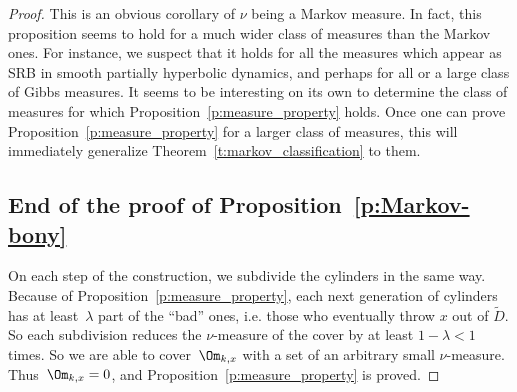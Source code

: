 \documentclass[a4paper,12pt]{amsart}
\begin{document}
\begin{proof}
This is an obvious corollary of $\nu$ being a Markov measure.
In fact, this proposition seems to hold for a much wider class of measures than the Markov ones. For instance, we suspect that it holds for all the measures which appear as SRB in smooth partially hyperbolic dynamics, and perhaps for all or a large class of Gibbs measures. It seems to be interesting on its own to determine the class of measures for which Proposition~\ref{p:measure_property} holds. Once one can prove Proposition~\ref{p:measure_property} for a larger class of measures, this will immediately generalize Theorem~\ref{t:markov_classification} to them.




\subsection*{End of the proof of Proposition~\ref{p:Markov-bony}}

On each step of the construction, we subdivide the cylinders in the same way. Because of Proposition~\ref{p:measure_property}, each next generation of cylinders has at least~$\lambda$ part of the ``bad'' ones, i.e. those who eventually throw $x$ out of $\tilde D$. So each subdivision reduces the $\nu$-measure of the cover by at least $1-\lambda < 1$ times. So we are able to cover~$\Om_{k,x}$ with a set of an arbitrary small $\nu$-measure. Thus~$\Om_{k,x} = 0$, and Proposition~\ref{p:measure_property} is proved.


\end{proof}
\end{document}
